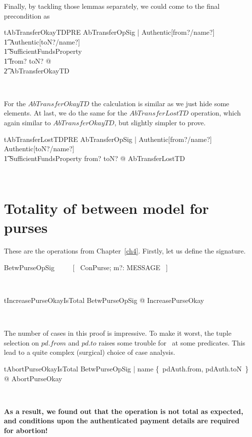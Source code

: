 %
Finally, by tackling those lemmas separately, we could come to the final
precondition as
%
\begin{LNewThm}
\begin{theorem}{tAbTransferOkayTDPRE}
    \forall AbTransferOpSig |  Authentic[from?/name?] \\
        \t1 \land Authentic[toN?/name?] \\
        \t1 \land SufficientFundsProperty \\
        \t1 \land from? \neq toN? @ \\
            \t2 \pre AbTransferOkayTD
\end{theorem}~\end{LNewThm}
%
For the $AbTransferOkayTD$ the calculation is similar as we just hide some elements.
At last, we do the same for the $AbTransferLostTD$ operation, which again
similar to $AbTransferOkayTD$, but slightly simpler to prove.
%
\begin{LNewThm}
\begin{theorem}{tAbTransferLostTDPRE}
    \forall AbTransferOpSig |  Authentic[from?/name?] \land Authentic[toN?/name?] \\
        \t1 \land SufficientFundsProperty \land from? \neq toN? @ \pre AbTransferLostTD
\end{theorem}~\end{LNewThm}

\section{Totality of between model for purses}\label{ch8.between}

These are the operations from Chapter~\ref{ch4}.
Firstly, let us define the signature.
%
\begin{LNewSDef}
\begin{zed}
   BetwPurseOpSig ~~~~ [~ ConPurse; m?: MESSAGE ~]
\end{zed}~\end{LNewSDef}
%
\begin{LNewThm}
\begin{theorem}{tIncreasePurseOkayIsTotal}
    \forall BetwPurseOpSig @ \pre IncreasePurseOkay
\end{theorem}~\end{LNewThm}

The number of cases in this proof is impressive. To make it
worst, the tuple selection on $pd.from$ and $pd.to$ raises
some trouble for \zeves\ at some predicates. This lead to
a quite complex (surgical) choice of case analysis.
%
\begin{LNewThm}
\begin{theorem}{tAbortPurseOkayIsTotal}
    \forall BetwPurseOpSig | name \in  \{~pdAuth.from, pdAuth.toN~\} @ \pre AbortPurseOkay
\end{theorem}~\end{LNewThm}
%
\textbf{As a result, we found out that the operation is not total as expected,
and conditions upon the authenticated payment details are required for
abortion!}

